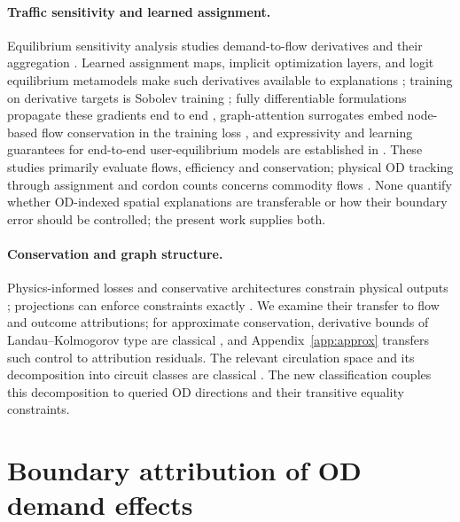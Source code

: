 \documentclass[a4paper,fleqn]{cas-sc}
\begin{document}
\paragraph{Traffic sensitivity and learned assignment.}
Equilibrium sensitivity analysis studies demand-to-flow derivatives and
their aggregation
\citep{tobin1988sensitivity,yang2005sensitivity,josefsson2007sensitivity,patriksson2003aggregated}.
Learned assignment maps, implicit optimization layers, and logit
equilibrium metamodels make such derivatives available to explanations
\citep{liu2023endtoend,amos2017optnet,lassen2025learning}; training on
derivative targets is Sobolev training
\citep{czarnecki2017sobolev,yuan2022sobolev}; fully differentiable
formulations propagate these gradients end to end
\citep{li2026differentiable,seo2026differentiable}, graph-attention
surrogates embed node-based flow conservation in the training loss
\citep{liu2024heterogeneous,liu2025multiclass}, and expressivity and
learning guarantees for end-to-end user-equilibrium models are
established in \citet{liu2025endtoend}. These studies primarily
evaluate flows, efficiency and conservation; physical OD tracking
through assignment and cordon counts concerns commodity flows
\citep{sheffi1985urban,vanzuylen1980most,bar2002origin}. None
quantify whether OD-indexed spatial explanations are transferable or
how their boundary error should be controlled; the present work
supplies both.

\paragraph{Conservation and graph structure.}
Physics-informed losses and conservative architectures constrain physical
outputs \citep{raissi2019physics,shi2021physics,richterpowell2022neural};
projections can enforce constraints exactly \citep{valente2025physics,baez2024guaranteeing}.
We examine their transfer to flow and outcome attributions; for
approximate conservation, derivative bounds of Landau--Kolmogorov type
are classical \citep{shadrin2014landau}, and
Appendix~\ref{app:approx} transfers such control to attribution
residuals. The relevant
circulation space and its decomposition into circuit classes are classical
\citep{oxley2011matroid,hopcroft1973algorithm}. The new classification couples
this decomposition to queried OD directions and their transitive equality
constraints.

\section{Boundary attribution of OD demand effects}\label{sec:objects}
\end{document}
